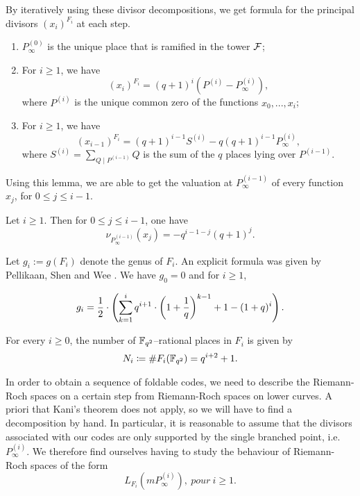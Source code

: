 \documentclass[10pt]{article}
\begin{document}
By iteratively using these divisor decompositions, we get formula for the principal divisors $(x_i)^{F_i}$ at each step.
\begin{lemma} \label{div princ}
\begin{enumerate}
\item $P_{\infty}^{(0)}$ is the unique place that is ramified in the tower $\mathcal{F}$;
\item For $i \geq 1$, we have 
\[(x_i)^{F_i} = (q+1)^i \left(P^{(i)} - P_{\infty}^{(i)}\right),\]
where $P^{(i)}$ is the unique common zero of the functions $x_0,...,x_i$;
\item For $i \geq 1$, we have 
\[(x_{i-1})^{F_i} = (q+1)^{i-1}S^{(i)} - q(q+1)^{i-1}P_{\infty}^{(i)},\]
where $ S^{(i)} = \sum_{Q\mid P^{(i-1)}} Q$ is the sum of the $q$ places lying over $P^{(i-1)}$.
\end{enumerate}
\end{lemma}

Using this lemma, we are able to get the valuation at $P_{\infty}^{(i-1)}$ of every function $x_j$, for $0 \leq j \leq i-1$.

\begin{corollary} \label{val pinf}
Let $i \geq 1$. Then for $0 \leq j \leq i-1$, one have
\[\nu_{P_{\infty}^{(i-1)}}(x_j) = - q^{i-1-j}(q+1)^j.\]
\end{corollary}

Let $g_i:=g(F_i)$ denote the genus of $F_i$. An explicit formula was given by Pellikaan, Shen and Wee \cite[Proposition 4]{PSW91}. We have $g_0=0$ and for $i\geq 1$, 

\begin{equation}\label{eq:genus_herm}
	g_i =\dfrac{1}{2} \cdot \left(\sum\limits_{k=1}^i q^{i+1} \cdot \left(1+\frac{1}{q}\right)^{k-1} +1 -(1+q)^i\right).
\end{equation}

For every $i \geq 0$, the number of $\mathbb{F}_{q^2}$--rational places in $F_i$ is given by
\[N_i \coloneqq \#F_i(\mathbb{F}_{q^2}) = q^{i+2}+1.\]

In order to obtain a sequence of foldable codes, we need to describe the Riemann-Roch spaces on a certain step from Riemann-Roch spaces on lower curves. A priori that Kani's theorem does not apply, so we will have to find a decomposition by hand. In particular, it is reasonable to assume that the divisors associated with our codes are only supported by the single branched point, i.e. $P^{(i)}_{\infty}$. We therefore find ourselves having to study the behaviour of Riemann-Roch spaces of the form 
\[L_{F_i}\left(mP^{(i)}_{\infty}\right), \ pour \ i \geq 1.\] 
\end{document}
